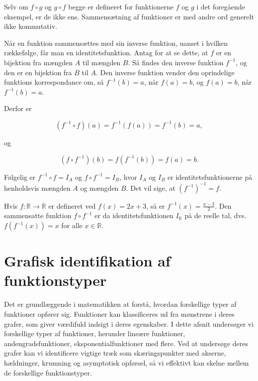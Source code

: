 \begin{remark}
Selv om \( f \circ g \) og \( g \circ f \) begge er defineret for funktionerne \( f \) og \( g \) i det foregående eksempel, er de ikke ens. Sammensætning af funktioner er med andre ord generelt ikke kommutativ.
  
\end{remark}

Når en funktion sammensættes med sin inverse funktion, uanset i hvilken rækkefølge, får man en identitetsfunktion. Antag for at se dette, at \( f \) er en bijektion fra mængden \( A \) til mængden \( B \). Så findes den inverse funktion \( f^{-1} \), og den er en bijektion fra \( B \) til \( A \). Den inverse funktion vender den oprindelige funktions korrespondance om, så \( f^{-1}(b)=a \), når \( f(a)=b \), og \( f(a)=b \), når \( f^{-1}(b)=a \).

Derfor er

\[
\left(f^{-1} \circ f\right)(a) = f^{-1}(f(a)) = f^{-1}(b) = a,
\]

og

\[
\left(f \circ f^{-1}\right)(b) = f\left(f^{-1}(b)\right) = f(a) = b.
\]

Følgelig er \( f^{-1} \circ f = I_A \) og \( f \circ f^{-1} = I_B \), hvor \( I_A \) og \( I_B \) er identitetsfunktionerne på henholdsvis mængden \( A \) og mængden \( B \). Det vil sige, at \( \left(f^{-1}\right)^{-1} = f \).

\begin{example}
    Hvis $f: \mathbb{R} \rightarrow \mathbb{R}$ er defineret ved $f(x)=2 x+3$, så er $f^{-1}(x)=\frac{x-3}{2}$. Den sammensatte funktion $f \circ f^{-1}$ er da identitetsfunktionen $I_{\mathbb{R}}$ på de reelle tal, dvs. $f\left(f^{-1}(x)\right)=x$ for alle $x \in \mathbb{R}$.
\end{example}

\section{Grafisk identifikation af funktionstyper}
Det er grundlæggende i matematikken at forstå, hvordan forskellige typer af funktioner opfører sig. Funktioner kan klassificeres ud fra mønstrene i deres grafer, som giver værdifuld indsigt i deres egenskaber. I dette afsnit undersøger vi forskellige typer af funktioner, herunder lineære funktioner, andengradsfunktioner, eksponentialfunktioner med flere. Ved at undersøge deres grafer kan vi identificere vigtige træk som skæringspunkter med akserne, hældninger, krumning og asymptotisk opførsel, så vi effektivt kan skelne mellem de forskellige funktionstyper.

